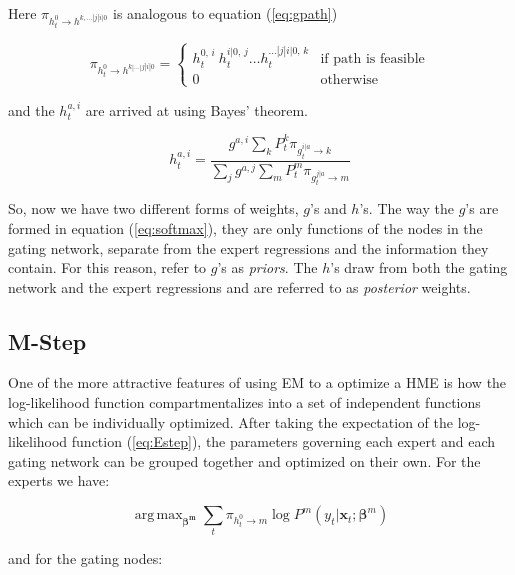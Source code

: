 \documentclass[12pt]{article}
\newcommand{\gateprod}[2]{\pi_{#1 \longrightarrow #2}}
\newcommand{\shortsum}[1]{\sum \nolimits_{#1}}
\newcommand{\h}[2]{h^{#1}_{#2}}
\DeclareMathOperator*{\argmax}{arg\,max}
\begin{document}
Here $\gateprod{h^{0}_{t}}{h^{k,\dots|j|i|0}}$ is analogous to equation (\ref{eq:gpath})

\begin{equation} \label{eq:hpath}
  \gateprod{h^{0}_{t}}{h^{k|\ldots|j|i|0}} =
    \begin{cases} 
       h^{0, \, i}_{t} \ h^{i|0, \, j}_{t} \ldots h^{\dots|j|i|0, \, k}_{t} & \textrm{if path is feasible} \\
       0 & \textrm{otherwise}
    \end{cases}
\end{equation}

and the $h^{a, i}_{t}$ are arrived at using Bayes' theorem.

\begin{equation} \label{eq:posteriornode}
  \h{a,i}{t} = \frac{g^{a, i} \shortsum{k} P^{k}_{t} \gateprod{g^{i|a}_{t}}{k}}{\shortsum{j} g^{a, j} \shortsum{m} P^{m}_{t} \gateprod{g^{j|a}_{t}}{m}}
\end{equation}


So, now we have two different forms of weights, $g$'s and $h$'s. The
way the $g$'s are formed in equation (\ref{eq:softmax}), they are only
functions of the nodes in the gating network, separate from the
expert regressions and the information they contain. For this reason,
\citet{JordanJacobs1993} refer to $g$'s as \textit{priors}.
The $h$'s draw from both the gating network and the expert regressions and
are referred to as \textit{posterior} weights.


\subsection{M-Step} \label{sec:Mstep}

One of the more attractive features of using EM to a optimize a
HME is how the log-likelihood function compartmentalizes into a set 
of independent functions which can be individually optimized. After
taking the expectation of the log-likelihood function (\ref{eq:Estep}), the
parameters governing each expert and each gating network can be grouped
together and optimized on their own. For the experts we have:

\begin{equation} \label{eq:BetaUpdate}
  \argmax_{\boldsymbol{\beta^{m}}} \sum_{t} \gateprod{h^{0}_{t}}{m} \log P^{m} (y_{t}| \boldsymbol{x}_{t}; \boldsymbol{\beta}^{m})
\end{equation}

and for the gating nodes:
\end{document}
